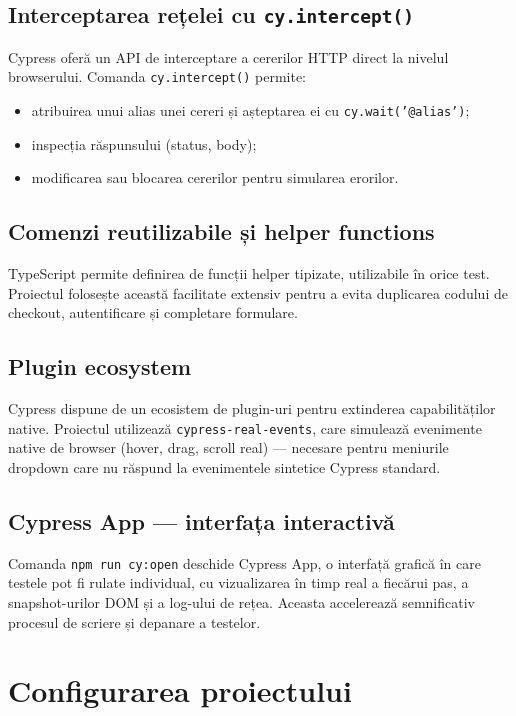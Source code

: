 \subsection{Interceptarea rețelei cu \texttt{cy.intercept()}}

Cypress oferă un API de interceptare a cererilor HTTP direct la nivelul browserului.
Comanda \texttt{cy.intercept()} permite:
\begin{itemize}
    \item atribuirea unui alias unei cereri și așteptarea ei cu \texttt{cy.wait('@alias')};
    \item inspecția răspunsului (status, body);
    \item modificarea sau blocarea cererilor pentru simularea erorilor.
\end{itemize}

\subsection{Comenzi reutilizabile și helper functions}

TypeScript permite definirea de funcții helper tipizate, utilizabile în orice test.
Proiectul folosește această facilitate extensiv pentru a evita duplicarea codului de
checkout, autentificare și completare formulare.

\subsection{Plugin ecosystem}

Cypress dispune de un ecosistem de plugin-uri pentru extinderea capabilităților native.
Proiectul utilizează \texttt{cypress-real-events}, care simulează evenimente native de
browser (hover, drag, scroll real) --- necesare pentru meniurile dropdown care nu
răspund la evenimentele sintetice Cypress standard.

\subsection{Cypress App --- interfața interactivă}

Comanda \texttt{npm run cy:open} deschide Cypress App, o interfață grafică în care testele
pot fi rulate individual, cu vizualizarea în timp real a fiecărui pas, a snapshot-urilor DOM
și a log-ului de rețea. Aceasta accelerează semnificativ procesul de scriere și depanare a testelor.

\section{Configurarea proiectului}

